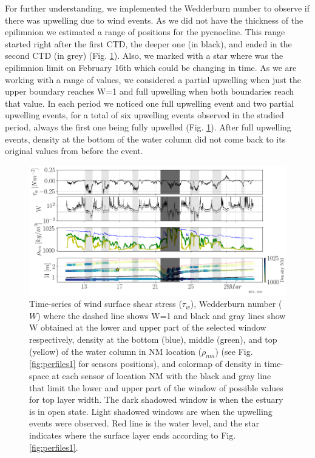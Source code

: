 \documentclass[tesis.tex]{subfiles}
\begin{document}
For further understanding, we implemented the Wedderburn number to observe if there was upwelling due to wind events. As we did not have the thickness of the epilimnion we estimated a range of positions for the pycnocline. This range started right after the first CTD, the deeper one (in black), and ended in the second CTD (in grey) (Fig. \ref{fig:wedd}). Also, we marked with a star where was the epilimnion limit on February 16th which could be changing in time. As we are working with a range of values, we considered a partial upwelling when just the upper boundary reaches W=1 and full upwelling when both boundaries reach that value. In each period we noticed one full upwelling event and two partial upwelling events, for a total of six upwelling events observed in the studied period, always the first one being fully upwelled (Fig. \ref{fig:wedd}). After full upwelling events, density at the bottom of the water column did not come back to its original values from before the event. \\

\begin{figure}[h!]
    \centering
    \includegraphics[width=\textwidth]{Imagenes/wedd.png}
    \caption{Time-series of wind surface shear stress ($\tau_w$), Wedderburn number ($W$) where the dashed line shows W=1 and black and gray lines show W obtained at the lower and upper part of the selected window respectively, density at the bottom (blue), middle (green), and top (yellow) of the water column in NM location ($\rho_{nm}$) (see Fig. \ref{fig:perfiles1} for sensors positions), and colormap of density in time-space at each sensor of location NM with the black and gray line that limit the lower and upper part of the window of possible values for top layer width. The dark shadowed window is when the estuary is in open state. Light shadowed windows are when the upwelling events were observed. Red line is the water level, and the star indicates where the surface layer ends according to Fig. \ref{fig:perfiles1}.}
    \label{fig:wedd}
\end{figure}
\end{document}
